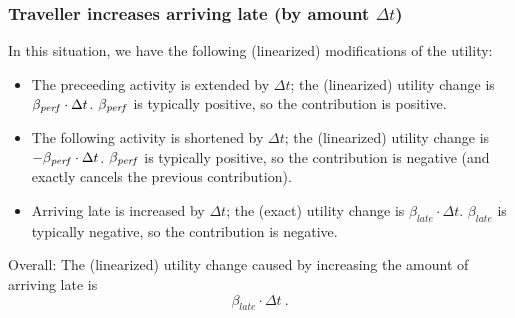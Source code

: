 \subsubsection{Traveller increases arriving late (by amount $\Delta t$)}

In this situation, we have the following (linearized) modifications of the utility:
\begin{itemize}

\item The preceeding activity is extended by $\Delta t$; the
(linearized) utility change is $\beta_{\it perf} \cdot \Delta
t$. $\beta_{\it perf}$ is typically positive, so the contribution is
positive.

\item The following activity is shortened by $\Delta t$; the (linearized)  utility change is $- \beta_{\it perf} \cdot \Delta t$. $\beta_{\it perf}$ is  typically positive, so the contribution is negative (and exactly cancels  the previous contribution).

\item Arriving late is increased by $\Delta t$; the (exact) utility change  is $\beta_{late} \cdot \Delta t$. $\beta_{late}$ is typically negative, so  the contribution is negative.

\end{itemize}

Overall: The (linearized) utility change caused by increasing the amount of arriving late is
\[
\beta_{late} \cdot \Delta t \ .
\]



